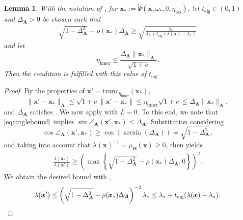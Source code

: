 \documentclass[a4paper,11pt,oneside]{amsart}
\newtheorem{lemma}[theorem]{Lemma}
\theoremstyle{definition}
\theoremstyle{remark}
\newcommand{\A}{\ten A}
\newcommand{\ten}[1]{\boldsymbol{#1}}
\newcommand{\etain}{\eta_{\mathrm{inner}}}
\newcommand{\etares}{\eta_{\mathrm{res}}}
\newcommand{\teig}{t_{\mathrm{eig}}}
\numberwithin{equation}{section}
\numberwithin{theorem}{section}
\begin{document}
%
\begin{lemma}
With the notation of , for $\ten x_\ast := \tilde \Psi(\ten x, \omega_\ast, 0, \etares)$, let
$\teig \in (0,1)$ and $\Delta_{\ten A} > 0$ be chosen such that
\begin{align}\label{DeltaAcond}
\sqrt{1-\Delta_{\ten A}^2} - \rho(\ten x_\ast) \Delta_{\ten A} \geq \sqrt{ \frac{\lambda_\ast}{\lambda_\ast + \teig (\lambda(\ten x) - \lambda_\ast)} }
\end{align}
and let
\begin{equation}\label{eq:etaxdef}
 \etain \leq \frac{ \Delta_{\ten A}  \|\ten x_\ast\|_{\A} }{ \sqrt{1 + c}} .
\end{equation}
Then the condition  is fulfilled with this value of $\teig$.
\end{lemma}
\begin{proof}
By the properties of $\ten x' = \mathrm{trunc}_{\etain}(\ten x_\ast)$,
\begin{equation}\label{eq:anglebound}
\|\ten x'-\ten x_\ast\|_{\ten A} \leq \sqrt{1+c} \|\ten x'-\ten x_\ast\| \leq
\etain \sqrt{1+c} \leq \Delta_{\ten A} \|\ten x_\ast\|_{\ten A},
\end{equation}
and $\Delta_{\ten A}$ satisfies . 
We now apply  with $L = 0$. 
 To this end, we note that \eqref{eq:anglebound} implies $\sin\angle_{\ten A}(\ten x',\ten x_\ast) \leq \Delta_{\ten A}$. Substitution considering 
 \[ \cos \angle_{\ten A}(\ten x',\ten x_\ast) \geq \cos(\arcsin(\Delta_{\ten A})) = \sqrt{1 - \Delta_{\ten A}^2}, \] 
 and taking into account that $\lambda(\ten x)^{-1} = \mu_{\ten B}(\ten x) \geq 0$, then yields 
\begin{align}\label{ribound}
 \frac{\lambda(\ten x_\ast)}{\lambda(\ten x')} \geq  \left( \max \left\{ \sqrt{1-\Delta_{\ten A}^2} - \rho(\ten x_\ast) \Delta_{\ten A}, 0 \right\} \right)^2 .
\end{align}
We obtain the desired bound  with ,
 \begin{equation*}
  \lambda(\ten x') \leq  \left(  \sqrt{1-\Delta_{\ten A}^2} - \rho(\ten x_\ast) \Delta_{\ten A}   \right)^{-2} \lambda_\ast \leq \lambda_\ast + \teig (\lambda(\ten x) - \lambda_\ast). \qedhere
 \end{equation*}
\end{proof}
\end{document}
